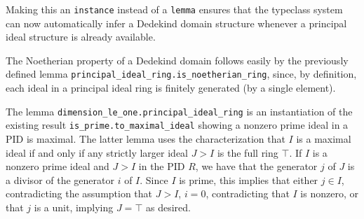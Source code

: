 \documentclass[a4paper,USenglish,cleveref, autoref, thm-restate]{lipics-v2021}
\newcommand{\lean}[1]{\texttt{#1}\xspace} %
\begin{document}
Making this an \lean{instance} instead of a \lean{lemma} ensures that the typeclass system can now automatically infer a Dedekind domain structure whenever a principal ideal structure is already available.

The Noetherian property of a Dedekind domain follows easily by the previously defined lemma \lean{principal\_ideal\_ring.is\_noetherian\_ring}, since, by definition, each ideal in a principal ideal ring is finitely generated (by a single element).

The lemma \lean{dimension\_le\_one.principal\_ideal\_ring} is an instantiation of the existing result \lean{is\_prime.to\_maximal\_ideal} showing a nonzero prime ideal in a PID is maximal.
The latter lemma uses the characterization that $I$ is a maximal ideal if and only if any strictly larger ideal $J > I$ is the full ring $\top$.
If $I$ is a nonzero prime ideal and $J > I$ in the PID $R$, we have that the generator $j$ of $J$ is a divisor of the generator $i$ of $I$. Since $I$ is prime, this implies that either $j \in I$, contradicting the assumption that $J > I$, $i = 0$, contradicting that $I$ is nonzero, or that $j$ is a unit, implying $J = \top$ as desired.
\end{document}
